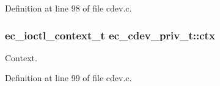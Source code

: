 Definition at line 98 of file cdev.\-c.

\subsubsection[{ctx}]{\setlength{\rightskip}{0pt plus 5cm}ec\-\_\-ioctl\-\_\-context\-\_\-t ec\-\_\-cdev\-\_\-priv\-\_\-t\-::ctx}\label{structec__cdev__priv__t_a0c0e1018dbfb482ddb1610f8f0b2f848}


Context. 



Definition at line 99 of file cdev.\-c.

